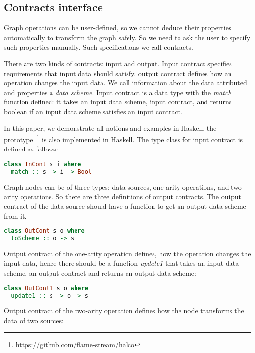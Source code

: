 \subsection{Contracts interface}

Graph operations can be user-defined, so we cannot deduce their properties automatically to transform the graph safely.
So we need to ask the user to specify such properties manually.
Such specifications we call contracts.

There are two kinds of contracts: input and output.
Input contract specifies requirements that input data should satisfy, output contract defines how an operation changes the input data.
We call information about the data attributed and properties a {\em data scheme}.
Input contract is a data type with the {\em match} function defined: it takes an input data scheme, input contract, and returns boolean if an input data scheme satisfies an input contract.

In this paper, we demonstrate all notions and examples in Haskell, the prototype~\footnote{https://github.com/flame-stream/halco} is also implemented in Haskell. The type class for input contract is defined as follows:

\begin{lstlisting}[language=Haskell]
class InCont s i where
  match :: s -> i -> Bool
\end{lstlisting}

Graph nodes can be of three types: data sources, one-arity operations, and two-arity operations.
So there are three definitions of output contracts.
The output contract of the data source should have a function to get an output data scheme from it.

\begin{lstlisting}[language=Haskell]
class OutCont s o where
  toScheme :: o -> s
\end{lstlisting}

Output contract of the one-arity operation defines, how the operation changes the input data, hence there should be a function {\em update1} that takes an input data scheme, an output contract and returns an output data scheme:

\begin{lstlisting}[language=Haskell]
class OutCont1 s o where
  update1 :: s -> o -> s
\end{lstlisting}

Output contract of the two-arity operation defines how the node transforms the data of two sources:

